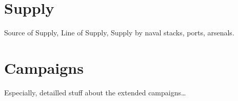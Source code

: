\section{Supply}
Source of Supply, Line of Supply, Supply by naval stacks, ports, arsenals.

\section{Campaigns}
Especially, detailled stuff about the extended campaigns\ldots

